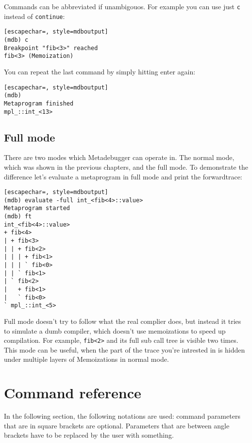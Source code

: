 Commands can be abbreviated if unambigouos. For example you can use just
\texttt{c} instead of \texttt{continue}:

\begin{minipage}{\linewidth}
\begin{lstlisting}[escapechar=, style=mdboutput]
(mdb) c
Breakpoint "fib<3>" reached
fib<3> (Memoization)
\end{lstlisting}
\end{minipage}

You can repeat the last command by simply hitting enter again:

\begin{minipage}{\linewidth}
\begin{lstlisting}[escapechar=, style=mdboutput]
(mdb)
Metaprogram finished
mpl_::int_<13>
\end{lstlisting}
\end{minipage}

\subsection{Full mode}

There are two modes which Metadebugger can operate in. The normal mode, which
was shown in the previous chapters, and the full mode. To demonstrate the
difference let's evaluate a metaprogram in full mode and print the
forwardtrace:

\begin{minipage}{\linewidth}
\begin{lstlisting}[escapechar=, style=mdboutput]
(mdb) evaluate -full int_<fib<4>::value>
Metaprogram started
(mdb) ft
int_<fib<4>::value>
+ fib<4>
| + fib<3>
| | + fib<2>
| | | + fib<1>
| | | ` fib<0>
| | ` fib<1>
| ` fib<2>
|   + fib<1>
|   ` fib<0>
` mpl_::int_<5>
\end{lstlisting}
\end{minipage}

\lstset{
    numbers=left
}

Full mode doesn't try to follow what the real complier does, but instead it
tries to simulate a dumb compiler, which doesn't use memoizations to speed up
compilation. For example, \texttt{fib<2>} and its full sub call tree is
visible two times. This mode can be useful, when the part of the trace you're
intrested in is hidden under multiple layers of Memoizations in normal mode.

\section{Command reference}

In the following section, the following notations are used: command parameters
that are in square brackets are optional. Parameters that are between angle
brackets have to be replaced by the user with something.



